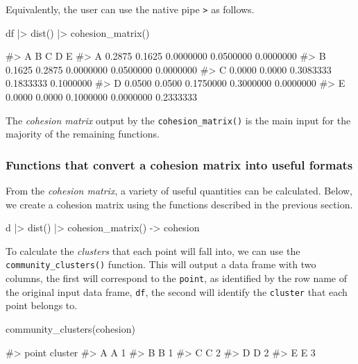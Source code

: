Equivalently, the user can use the native pipe
\texttt{\textbar{}\textgreater{}} as follows.

\begin{Schunk}
\begin{Sinput}
df |>
  dist() |>
  cohesion_matrix()
\end{Sinput}
\begin{Soutput}
#>        A      B         C         D         E
#> A 0.2875 0.1625 0.0000000 0.0500000 0.0000000
#> B 0.1625 0.2875 0.0000000 0.0500000 0.0000000
#> C 0.0000 0.0000 0.3083333 0.1833333 0.1000000
#> D 0.0500 0.0500 0.1750000 0.3000000 0.0000000
#> E 0.0000 0.0000 0.1000000 0.0000000 0.2333333
\end{Soutput}
\end{Schunk}

The \emph{cohesion matrix} output by the \texttt{cohesion\_matrix()} is
the main input for the majority of the remaining functions.

\hypertarget{functions-that-convert-a-cohesion-matrix-into-useful-formats}{%
\subsubsection{Functions that convert a cohesion matrix into useful
formats}\label{functions-that-convert-a-cohesion-matrix-into-useful-formats}}

From the \emph{cohesion matrix}, a variety of useful quantities can be
calculated. Below, we create a cohesion matrix using the functions
described in the previous section.

\begin{Schunk}
\begin{Sinput}
d |>
  dist() |>
  cohesion_matrix() -> cohesion
\end{Sinput}
\end{Schunk}

To calculate the \emph{clusters} that each point will fall into, we can
use the \texttt{community\_clusters()} function. This will output a data
frame with two columns, the first will correspond to the \texttt{point},
as identified by the row name of the original input data frame,
\texttt{df}, the second will identify the \texttt{cluster} that each
point belongs to.

\begin{Schunk}
\begin{Sinput}
community_clusters(cohesion)
\end{Sinput}
\begin{Soutput}
#>   point cluster
#> A     A       1
#> B     B       1
#> C     C       2
#> D     D       2
#> E     E       3
\end{Soutput}
\end{Schunk}

